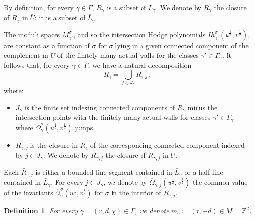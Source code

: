 \documentclass[12pt, a4paper]{amsart}
\newtheorem{defn}{Definition}[section]
\newcommand\Z{\mathbb Z}
\begin{document}
By definition, for every $\gamma \in \Gamma$, $R_\gamma$ is a subset of $L_\gamma$.
We denote by $\bar{R}_\gamma$ the closure of $R_\gamma$ in $\bar{U}$: it is a subset of 
$\bar{L}_\gamma$.



The moduli spaces $M_{\gamma'}^\sigma$, and so the intersection Hodge 
polynomials $Ih_{\gamma'}^\sigma(u^{\frac{1}{2}}, v^{\frac{1}{2}})$, are constant 
as a function of $\sigma$ for $\sigma$ lying in a given connected component of the complement in $U$ of the finitely many actual
walls for the classes $\gamma' \in \Gamma_\gamma$. 
It follows that, for every $\gamma \in \Gamma$, we have a natural decomposition
\[R_\gamma = \bigcup_{j \in J_\gamma} R_{\gamma,j}\,,\]
where:
\begin{itemize}
\item[(i)] $J_\gamma$ is the finite set indexing connected 
components of $R_\gamma$ minus the intersection points with the finitely many actual walls for classes $\gamma'\in \Gamma_\gamma$ where $\overline{\Omega}_\gamma^\sigma(u^{\frac{1}{2}},v^{\frac{1}{2}})$ jumps. 
\item[(ii)] $R_{\gamma,j}$ is the closure in $R_\gamma$ of the corresponding connected
component indexed by $j \in J_\gamma$.  We denote by $\bar{R}_{\gamma,j}$ the closure of $R_{\gamma,j}$ in 
$\bar{U}$.
\end{itemize}
Each $\bar{R}_{\gamma,j}$ is either a bounded line segment contained in $\bar{L}_\gamma$
or a half-line contained in $\bar{L}_\gamma$.
For every $j \in J_\gamma$, we denote by 
$\overline{\Omega}_{\gamma,j}(u^{\frac{1}{2}},v^{\frac{1}{2}})$ the common value of the invariants 
$\overline{\Omega}_\gamma^\sigma(u^{\frac{1}{2}},v^{\frac{1}{2}})$
for $\sigma$ in the interior of $R_{\gamma,j}$.




\begin{defn} \label{def_m_gamma}
For every $\gamma=(r,d,\chi) \in \Gamma$, we denote
$m_\gamma \coloneq  
(r,-d) \in M =\Z^2$.
\end{defn} 
\end{document}
